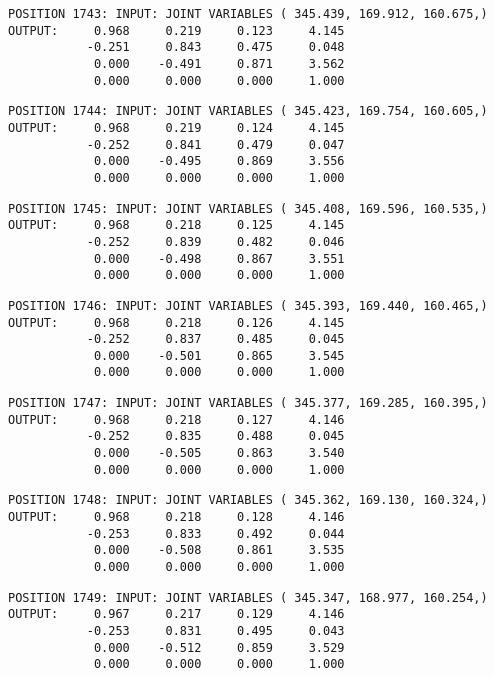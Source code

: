 \begin{verbatim}
POSITION 1743: INPUT: JOINT VARIABLES ( 345.439, 169.912, 160.675,)
OUTPUT:     0.968     0.219     0.123     4.145
           -0.251     0.843     0.475     0.048
            0.000    -0.491     0.871     3.562
            0.000     0.000     0.000     1.000
\end{verbatim} \pagebreak[1]\begin{verbatim}
POSITION 1744: INPUT: JOINT VARIABLES ( 345.423, 169.754, 160.605,)
OUTPUT:     0.968     0.219     0.124     4.145
           -0.252     0.841     0.479     0.047
            0.000    -0.495     0.869     3.556
            0.000     0.000     0.000     1.000
\end{verbatim} \pagebreak[1]\begin{verbatim}
POSITION 1745: INPUT: JOINT VARIABLES ( 345.408, 169.596, 160.535,)
OUTPUT:     0.968     0.218     0.125     4.145
           -0.252     0.839     0.482     0.046
            0.000    -0.498     0.867     3.551
            0.000     0.000     0.000     1.000
\end{verbatim} \pagebreak[1]\begin{verbatim}
POSITION 1746: INPUT: JOINT VARIABLES ( 345.393, 169.440, 160.465,)
OUTPUT:     0.968     0.218     0.126     4.145
           -0.252     0.837     0.485     0.045
            0.000    -0.501     0.865     3.545
            0.000     0.000     0.000     1.000
\end{verbatim} \pagebreak[1]\begin{verbatim}
POSITION 1747: INPUT: JOINT VARIABLES ( 345.377, 169.285, 160.395,)
OUTPUT:     0.968     0.218     0.127     4.146
           -0.252     0.835     0.488     0.045
            0.000    -0.505     0.863     3.540
            0.000     0.000     0.000     1.000
\end{verbatim} \pagebreak[1]\begin{verbatim}
POSITION 1748: INPUT: JOINT VARIABLES ( 345.362, 169.130, 160.324,)
OUTPUT:     0.968     0.218     0.128     4.146
           -0.253     0.833     0.492     0.044
            0.000    -0.508     0.861     3.535
            0.000     0.000     0.000     1.000
\end{verbatim} \pagebreak[1]\begin{verbatim}
POSITION 1749: INPUT: JOINT VARIABLES ( 345.347, 168.977, 160.254,)
OUTPUT:     0.967     0.217     0.129     4.146
           -0.253     0.831     0.495     0.043
            0.000    -0.512     0.859     3.529
            0.000     0.000     0.000     1.000
\end{verbatim} \pagebreak[1]\begin{verbatim}

\end{verbatim}
